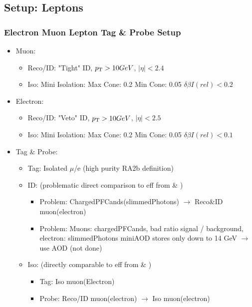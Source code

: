 \documentclass{beamer}
\begin{document}
\subsection{Setup: Leptons}
\begin{frame}
\frametitle{Electron Muon Lepton Tag \& Probe Setup }
\begin{itemize}
 \item Muon:
 \begin{itemize}
  \item Reco/ID: "Tight" ID, $p_{\text{T}}>10 GeV$, $|\eta|<2.4$
  \item Iso: Mini Isolation: Max Cone: 0.2 Min Cone: 0.05 $\delta \beta I(rel)<0.2$
 \end{itemize}
  \item Electron:
 \begin{itemize}
  \item Reco/ID: "Veto" ID, $p_{\text{T}}>10 GeV$, $|\eta|<2.5$
  \item Iso: Mini Isolation: Max Cone: 0.2 Min Cone: 0.05 $\delta \beta I(rel)<0.1$
 \end{itemize}
 \item Tag \& Probe:
 \begin{itemize}
  \item Tag: Isolated $\mu$/e (high purity RA2b definition)
 \item ID:  (problematic direct comparison to eff from \ttbar \& \wpj)
 \begin{itemize}
  \item Problem: ChargedPFCands(slimmedPhotons) $\rightarrow$ Reco\&ID muon(electron)
  \item Problem: Muons: chargedPFCands, bad ratio signal / background, electron: slimmedPhotons miniAOD stores only down to 14 GeV $\rightarrow$ use AOD (not done)
 \end{itemize}
  \item Iso: (directly comparable to eff from \ttbar \& \wpj)
 \begin{itemize}
  \item Tag: Iso muon(Electron)
  \item Probe: Reco/ID muon(electron) $\rightarrow$ Iso muon(electron)
 
 \end{itemize}

 \end{itemize}
\end{itemize}
\end{frame}
\end{document}
